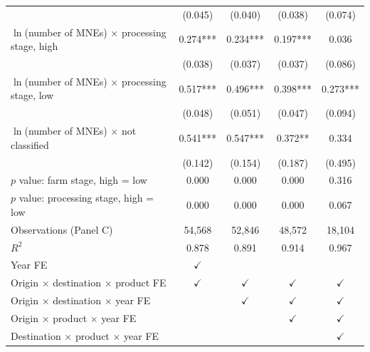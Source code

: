 \begin{tabular}{l*{4}{c}}
 & (0.045) & (0.040) & (0.038) & (0.074) \\
$\ln$(number of MNEs) $\times$ processing stage, high & 0.274*** & 0.234*** & 0.197*** & 0.036 \\
 & (0.038) & (0.037) & (0.037) & (0.086) \\
$\ln$(number of MNEs) $\times$ processing stage, low & 0.517*** & 0.496*** & 0.398*** & 0.273*** \\
 & (0.048) & (0.051) & (0.047) & (0.094) \\
$\ln$(number of MNEs) $\times$ not classified & 0.541*** & 0.547*** & 0.372** & 0.334 \\
 & (0.142) & (0.154) & (0.187) & (0.495) \\
$p$ value: farm stage, high = low & 0.000 & 0.000 & 0.000 & 0.316 \\
$p$ value: processing stage, high = low & 0.000 & 0.000 & 0.000 & 0.067 \\
Observations (Panel C) & 54,568 & 52,846 & 48,572 & 18,104 \\
$R^2$ & 0.878 & 0.891 & 0.914 & 0.967 \\
\midrule
Year FE & $\checkmark$ &  &  &  \\
Origin $\times$ destination $\times$ product FE & $\checkmark$ & $\checkmark$ & $\checkmark$ & $\checkmark$ \\
Origin $\times$ destination $\times$ year FE &  & $\checkmark$ & $\checkmark$ & $\checkmark$ \\
Origin $\times$ product $\times$ year FE &  &  & $\checkmark$ & $\checkmark$ \\
Destination $\times$ product $\times$ year FE &  &  &  & $\checkmark$ \\
\bottomrule
\end{tabular}
